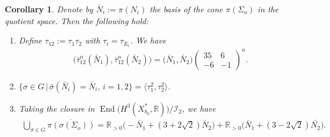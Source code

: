 \documentclass[pdftex]{sigma}
\numberwithin{equation}{section}
\newtheorem{Corollary}[Theorem]{Corollary}
\begin{document}
\begin{Corollary}\label{cor:Union-cones-P3P3}Denote by $\bar{N}_{i}:=\pi(N_{i})$ the basis of the cone $\pi(\Sigma_{o})$ in the quotient space. Then the following hold:
\begin{enumerate}\itemsep=0pt
\item[{\rm (1)}] Define $\tau_{12}:=\tau_{1}\tau_{2}$ with $\tau_{i}=\tau_{E_{i}}$. We have
\begin{gather*}
\big(\bar{\tau}_{12}^{n}(\bar{N}_{1}),\bar{\tau}_{12}^{n}(\bar{N}_{2})\big)=\big(\bar{N}_{1},\bar{N}_{2}\big)\left(\begin{matrix}35 & 6\\
-6 & -1
\end{matrix}\right)^{n}.
\end{gather*}

\item[{\rm (2)}] $\{ \sigma\in G\,|\,\bar{\sigma}(\bar{N}_{i})=\bar{N}_{i}, \, i=1,2 \} =\langle\tau_{1}^{2},\tau_{2}^{2}\rangle$.

\item[{\rm (3)}] Taking the closure in $\operatorname{End}\big(H^{3}(X_{b_{0}}^{*},\mathbb{R})\big)/\mathcal{I}_{2}$, we have
\begin{gather*}
\bigcup_{\sigma\in G}\overline{\pi(\sigma(\Sigma_{o}))}=\mathbb{R}_{>0}\big({-}\bar{N}_{1}+(3+2\sqrt{2})\bar{N}_{2}\big)+\mathbb{R}_{>0}\big(\bar{N}_{1}+(3-2\sqrt{2})\bar{N_{2}}\big).
\end{gather*}
\end{enumerate}\end{Corollary}
\end{document}
